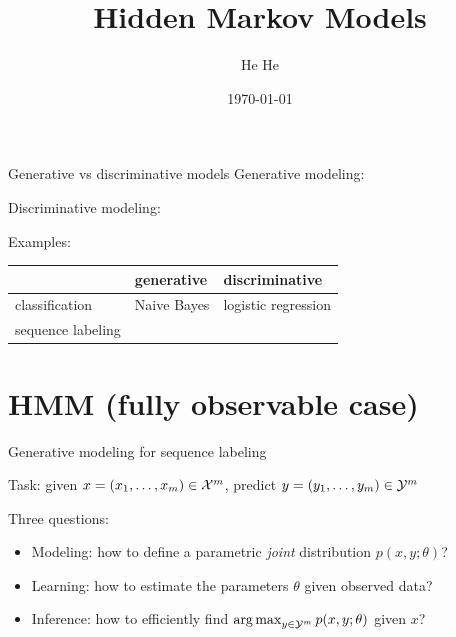 \documentclass[usenames,dvipsnames,notes]{beamer}
\title[CSCI-GA.2590]{Hidden Markov Models}
\author[He He]{He He
}
\institute[NYU]{New York University}
\date{\today}
\begin{document}
\begin{frame}
\titlepage
\end{frame}

\begin{frame}
    {Generative vs discriminative models}
    Generative modeling:

    Discriminative modeling:

    Examples:
    \begin{table}
        \begin{tabular}{lll}
            & generative & discriminative\\
            \midrule
            classification & Naive Bayes & logistic regression\\
            sequence labeling & & 
        \end{tabular}
    \end{table}
\end{frame}

\section{HMM (fully observable case)}

\begin{frame}
    {Generative modeling for sequence labeling}

    Task: given $x=(x_1,\ldots,x_m) \in \mathcal{X}^m$, predict $y=(y_1,\ldots,y_m)\in\mathcal{Y}^m$

    Three questions:\\
    \begin{itemize}
        \item Modeling: how to define a parametric \emph{joint} distribution $p(x,y; \theta)$?
        \item Learning: how to estimate the parameters $\theta$ given observed data?
        \item Inference: how to efficiently find $\operatorname*{arg\,max}_{y\in\mathcal{Y}^m} p(x,y;\theta)$ given $x$?
    \end{itemize}
\end{frame}
\end{document}
